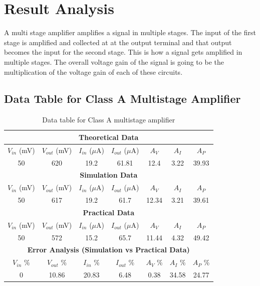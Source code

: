 \documentclass[12pt]{article}
\begin{document}
\FloatBarrier
\section{Result Analysis}
A multi stage amplifier amplifies a signal in multiple stages. The input of the first stage is amplified and collected at at the output terminal and that output becomes the input for the second stage. This is how a signal gets amplified in multiple stages. The overall voltage gain of the signal is going to be the multiplication of the voltage gain of each of these circuits.

\subsection{Data Table for Class A Multistage Amplifier}
\bgroup
\def\arraystretch{1.5}
\begin{table}[h!]
    \centering
    \caption{Data table for Class A multistage amplifier}
    \begin{tabular}{|c|c|c|c|c|c|c|}
        \hline
        \multicolumn{7}{|c|}{\textbf{Theoretical Data}} \\
        \hline
        $V_{in}$ (mV) & $V_{out}$ (mV) & $I_{in}$ ($\mu$A) & $I_{out}$ ($\mu$A) & $A_V$ & $A_I$ & $A_P$ \\ \hline
        50 & 620 & 19.2 & 61.81 & 12.4 & 3.22 & 39.93 \\ \hline\hline
        \multicolumn{7}{|c|}{\textbf{Simulation Data}} \\
        \hline
        $V_{in}$ (mV) & $V_{out}$ (mV) & $I_{in}$ ($\mu$A) & $I_{out}$ ($\mu$A) & $A_V$ & $A_I$ & $A_P$ \\ \hline
        50 & 617 & 19.2 & 61.7 & 12.34 & 3.21 & 39.61 \\ \hline\hline
        \multicolumn{7}{|c|}{\textbf{Practical Data}} \\
        \hline
        $V_{in}$ (mV) & $V_{out}$ (mV) & $I_{in}$ ($\mu$A) & $I_{out}$ ($\mu$A) & $A_V$ & $A_I$ & $A_P$ \\ \hline
        50 & 572 & 15.2 & 65.7 & 11.44 & 4.32 & 49.42 \\ \hline\hline
        \multicolumn{7}{|c|}{\textbf{Error Analysis (Simulation vs Practical Data)}} \\
        \hline
        $V_{in}$ \% & $V_{out}$ \% & $I_{in}$ \% & $I_{out}$ \% & $A_V$ \% & $A_I$ \% & $A_P$ \% \\ \hline
        0 & 10.86 & 20.83 & 6.48 & 0.38 & 34.58 & 24.77 \\ \hline
    \end{tabular}
\end{table}
\egroup
\end{document}
